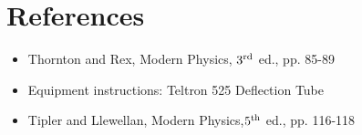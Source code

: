 \section{References}
\begin{itemize}
\item Thornton and Rex, Modern Physics, $3^{\rm rd}$ ed., pp. 85-89
\item Equipment instructions: Teltron 525 Deflection Tube
\item Tipler and Llewellan, Modern Physics,$5^{\rm th}$ ed., pp. 116-118
\end{itemize}

